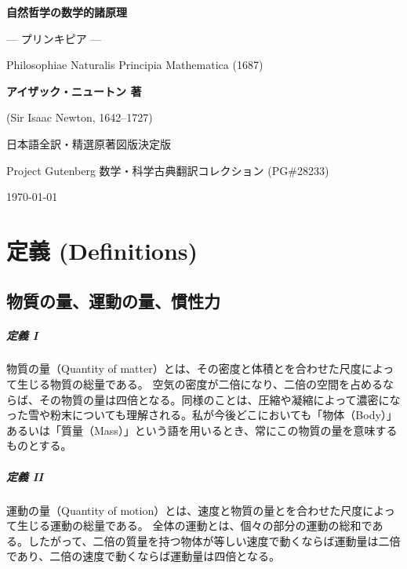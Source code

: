 \documentclass[a4paper,11pt,oneside,openany]{ltjsbook}
\begin{document}
\frontmatter
\begin{titlepage}
    \centering
    \vspace*{2cm}
    {\Huge\bfseries\sffamily 自然哲学の数学的諸原理\par}
    \vspace{0.8cm}
    {\Large\sffamily --- プリンキピア ---\par}
    \vspace{0.5cm}
    {\large Philosophiae Naturalis Principia Mathematica (1687)\par}
    \vspace{2cm}
    {\Large\bfseries アイザック・ニュートン 著\par}
    {\small (Sir Isaac Newton, 1642--1727)\par}
    \vspace{1.5cm}
    {\large 日本語全訳・精選原著図版決定版\par}
    \vfill
    {\large Project Gutenberg 数学・科学古典翻訳コレクション (PG\#28233)\par}
    {\small\today}
\end{titlepage}

\tableofcontents
\mainmatter

\chapter{定義 (Definitions)}

\section{物質の量、運動の量、慣性力}

\paragraph{定義 I}
物質の量（Quantity of matter）とは、その密度と体積とを合わせた尺度によって生じる物質の総量である。
空気の密度が二倍になり、二倍の空間を占めるならば、その物質の量は四倍となる。同様のことは、圧縮や凝縮によって濃密になった雪や粉末についても理解される。私が今後どこにおいても「物体（Body）」あるいは「質量（Mass）」という語を用いるとき、常にこの物質の量を意味するものとする。

\paragraph{定義 II}
運動の量（Quantity of motion）とは、速度と物質の量とを合わせた尺度によって生じる運動の総量である。
全体の運動とは、個々の部分の運動の総和である。したがって、二倍の質量を持つ物体が等しい速度で動くならば運動量は二倍であり、二倍の速度で動くならば運動量は四倍となる。
\end{document}

